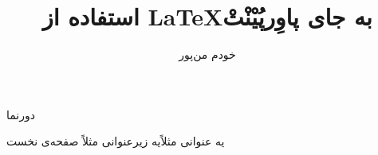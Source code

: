 \documentclass{beamer}
\title{استفاده از \LaTeX به جای پاوِرپُیْنْتْ}
\author{خودم من‌پور}
\begin{document}
\titlepage
\begin{frame}{دورنما}
\tableofcontents
\end{frame}
\begin{frame}{یه عنوانی مثلاً}{یه زیرعنوانی مثلاً}
صفحه‌ی نخست
\end{frame}
\end{document}
